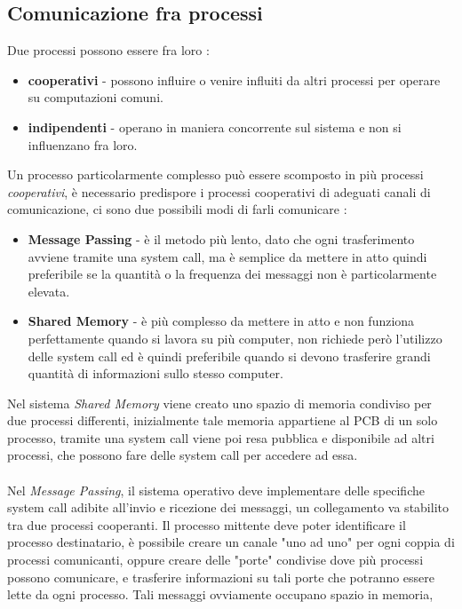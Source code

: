 \documentclass[12pt, letterpaper]{article}
\begin{document}
\subsection{Comunicazione fra processi}
Due processi possono essere fra loro :  \begin{itemize}
    \item \textbf{cooperativi} - possono influire o venire influiti da altri processi per operare su computazioni comuni.
    \item \textbf{indipendenti} - operano in maniera concorrente sul sistema e non si influenzano fra loro.
\end{itemize}
Un processo particolarmente complesso può essere scomposto in più processi \textit{cooperativi}, 
è necessario predispore i processi cooperativi di adeguati canali di comunicazione, ci sono due possibili 
modi di farli comunicare :\begin{itemize}
    \item \textbf{Message Passing} - è il metodo più lento, dato che ogni trasferimento avviene tramite
    una system call, ma è semplice da mettere in atto quindi preferibile se la quantità o la frequenza dei messaggi 
    non è particolarmente elevata.
    \item \textbf{Shared Memory} - è più complesso da mettere in atto e non funziona perfettamente quando si lavora 
    su più computer, non richiede però l'utilizzo delle system call ed è quindi preferibile quando si devono 
    trasferire grandi quantità di informazioni sullo stesso computer.
\end{itemize}
Nel sistema \textit{Shared Memory} viene creato uno spazio di memoria condiviso per due processi differenti, inizialmente 
tale memoria appartiene al PCB di un solo processo, tramite una system call viene poi resa pubblica e disponibile 
ad altri processi, che possono fare delle system call per accedere ad essa.
\\\hphantom{}\\ 
Nel \textit{Message Passing}, il sistema operativo deve implementare delle specifiche system call adibite 
all'invio e ricezione dei messaggi, un collegamento va stabilito tra due processi cooperanti. Il processo 
mittente deve poter identificare il processo destinatario, è possibile creare un canale "uno ad uno" per 
ogni coppia di processi comunicanti, oppure creare delle "porte" condivise dove più processi possono 
comunicare, e trasferire informazioni su tali porte che potranno essere lette da ogni processo. Tali messaggi 
ovviamente occupano spazio in memoria,
\end{document}
